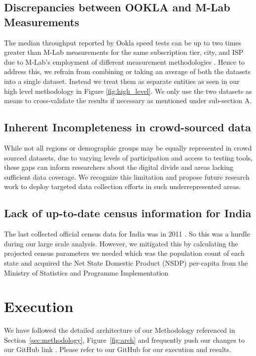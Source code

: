 \documentclass[conference]{IEEEtran}
\begin{document}
\subsection{Discrepancies between OOKLA and M-Lab Measurements}
The median throughput reported by Ookla speed tests can be up to two times greater than M-Lab measurements for the same subscription tier, city, and ISP due to M-Lab’s employment of different measurement methodologies \cite{5} \cite{6}. Hence to address this, we refrain from combining or taking an average of both the datasets into a single dataset. Instead we treat them as separate entities as seen in our high level methodology in Figure \ref{fig:high_level}. We only use the two datasets as means to cross-validate the results if necessary as mentioned under sub-section A.

\subsection{Inherent Incompleteness in crowd-sourced data}
While not all regions or demographic groups may be equally represented in crowd sourced datasets, due to varying levels of participation and access to testing tools, these gaps can inform researchers about the digital divide and areas lacking sufficient data coverage. We recognize this limitation and propose future research work to deploy targeted data collection efforts in such underrepresented areas.

\subsection{Lack of up-to-date census information for India}
The last collected official census data for India was in 2011 \cite{15}. So this was a hurdle during our large scale analysis. However, we mitigated this by calculating the projected census parameters we needed which was the population count of each state and acquired the Net State Domestic Product (NSDP) per-capita from the Ministry of Statistics and Programme Implementation \cite{16} \cite{17}

\section{Execution}

We have followed the detailed architecture of our Methodology referenced in Section~\ref{sec:methodology}, Figure~\ref{fig:arch} and frequently push our changes to our GitHub link \cite{9}. Please refer to our GitHub for our execution and results.
\end{document}
